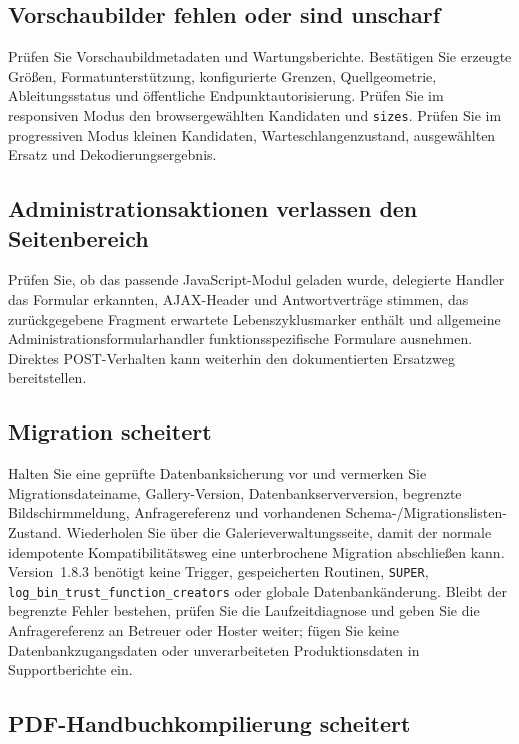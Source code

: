 \documentclass[11pt,a4paper]{article}
\newcommand{\version}{1.8.3}
\newcommand{\codeword}[1]{\nolinkurl{#1}}
\begin{document}
\subsection{Vorschaubilder fehlen oder sind unscharf}

Prüfen Sie Vorschaubildmetadaten und Wartungsberichte. Bestätigen Sie erzeugte
Größen, Formatunterstützung, konfigurierte Grenzen, Quellgeometrie,
Ableitungsstatus und öffentliche Endpunktautorisierung. Prüfen Sie im
responsiven Modus den browsergewählten Kandidaten und \codeword{sizes}. Prüfen
Sie im progressiven Modus kleinen Kandidaten, Warteschlangenzustand,
ausgewählten Ersatz und Dekodierungsergebnis.

\subsection{Administrationsaktionen verlassen den Seitenbereich}

Prüfen Sie, ob das passende JavaScript-Modul geladen wurde, delegierte Handler
das Formular erkannten, AJAX-Header und Antwortverträge stimmen, das
zurückgegebene Fragment erwartete Lebenszyklusmarker enthält und allgemeine
Administrationsformularhandler funktionsspezifische Formulare ausnehmen.
Direktes POST-Verhalten kann weiterhin den dokumentierten Ersatzweg
bereitstellen.

\subsection{Migration scheitert}

Halten Sie eine geprüfte Datenbanksicherung vor und vermerken Sie
Migrationsdateiname, Gallery-Version, Datenbankserverversion, begrenzte
Bildschirmmeldung, Anfragereferenz und vorhandenen
Schema-/Migrationslisten-Zustand. Wiederholen Sie über die
Galerieverwaltungsseite, damit der normale idempotente Kompatibilitätsweg eine
unterbrochene Migration abschließen kann. Version~\version{} benötigt keine
Trigger, gespeicherten Routinen, \codeword{SUPER},
\codeword{log\_bin\_trust\_function\_creators} oder globale Datenbankänderung.
Bleibt der begrenzte Fehler bestehen, prüfen Sie die Laufzeitdiagnose und geben
Sie die Anfragereferenz an Betreuer oder Hoster weiter; fügen Sie keine
Datenbankzugangsdaten oder unverarbeiteten Produktionsdaten in Supportberichte
ein.

\subsection{PDF-Handbuchkompilierung scheitert}
\end{document}
